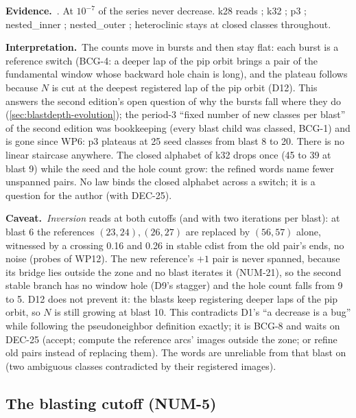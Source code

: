 \documentclass[11pt,a4paper]{article}
\newcommand{\evidence}{\par\smallskip\noindent\textbf{Evidence.}~}
\newcommand{\reading}{\par\smallskip\noindent\textbf{Interpretation.}~}
\newcommand{\caveat}{\par\smallskip\noindent\textbf{Caveat.}~}
\begin{document}
\evidence {}. At $10^{-7}$
\NumWpTwelveFineMonotone{} of the \NumWpTwelveFineSeries{} series never
decrease. k28 reads \NumWpTwelveKTwoEightFineSeed; k32
\NumWpTwelveKThreeTwoFineSeed; p3 \NumWpTwelvePThreeFineSeed; nested\_inner
\NumWpTwelveNestedInnerFineSeed; nested\_outer
\NumWpTwelveNestedOuterFineSeed; heteroclinic stays at
\NumWpTwelveHeteroclinicFineClosed{} closed classes throughout.

\reading The counts move in bursts and then stay flat: each burst is a
reference switch (BCG-4: a deeper lap of the pip orbit brings a pair of the
fundamental window whose backward hole chain is long), and the plateau
follows because $N$ is cut at the deepest registered lap of the pip orbit
(D12). This answers the second edition's open question of why the bursts
fall where they do (\cref{sec:blastdepth-evolution}); the period-3 ``fixed
number of new classes per blast'' of the second edition was bookkeeping
(every blast child was classed, BCG-1) and is gone since WP6: p3 plateaus at
25 seed classes from blast 8 to 20. There is no linear staircase anywhere.
The closed alphabet of k32 drops once (45 to 39 at blast 9) while the seed
and the hole count grow: the refined words name fewer unspanned pairs. No
law binds the closed alphabet across a switch; it is a question for the
author (with DEC-25).

\caveat \emph{Inversion} reads \NumWpTwelveInversionFineSeed{} at both
cutoffs (and with two iterations per blast): at blast 6 the references
$(23,24), (26,27)$ are replaced by $(56,57)$ alone, witnessed by a crossing
0.16 and 0.26 in stable cdist from the old pair's ends, no noise (probes of
WP12). The new reference's $+1$ pair is never spanned, because its bridge
lies outside the zone and no blast iterates it (NUM-21), so the second
stable branch has no window hole (D9's stagger) and the hole count falls
from 9 to 5. D12 does not prevent it: the blasts keep registering deeper
laps of the pip orbit, so $N$ is still growing at blast 10. This contradicts
D1's ``a decrease is a bug'' while following the pseudoneighbor definition
exactly; it is BCG-8 and waits on DEC-25 (accept; compute the reference
arcs' images outside the zone; or refine old pairs instead of replacing
them). The words are unreliable from that blast on (two ambiguous classes
contradicted by their registered images).

\subsection{The blasting cutoff (NUM-5)}
\end{document}
